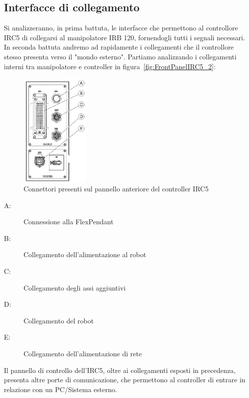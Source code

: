 \subsection{Interfacce di collegamento}
\label{subsec:InterfaceIRC5}
Si analizzeranno, in prima battuta, le interfacce che permettono al controllore IRC5 di collegarsi al manipolatore IRB 120, fornendogli tutti i segnali necessari. In seconda battuta andremo ad  rapidamente i collegamenti che il controllore stesso presenta verso il "mondo esterno".
\newpage
Partiamo analizzando i collegamenti interni tra manipolatore e controller in figura~\vref{fig:FrontPanelIRC5_2}:
\begin{figure}[h]
	\centering
	\includegraphics[width=0.3\textwidth]{Immagini/Connettori_IRC5}
	\caption{Connettori presenti sul pannello anteriore del controller IRC5}
	\label{fig:FrontPanelIRC5_2}
\end{figure}
\begin{description}
	\item[A:] Connessione alla FlexPendant
	\item[B:] Collegamento dell'alimentazione al robot
	\item[C:] Collegamento degli assi aggiuntivi
	\item[D:] Collegamento del robot
	\item[E:] Collegamento dell'alimentazione di rete
\end{description}
Il pannello di controllo dell’IRC5, oltre ai collegamenti esposti in precedenza, presenta altre porte di comunicazione, che permettono al controller di entrare in relazione con un PC/Sistema esterno.

